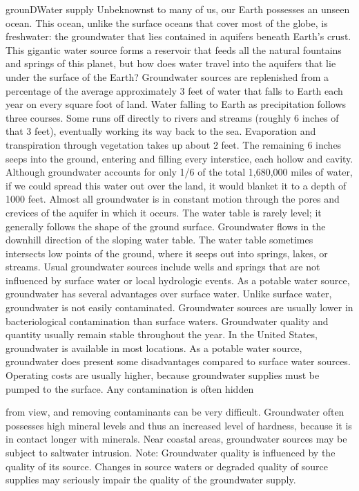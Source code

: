 \documentclass{article}
\begin{document}
grounDWater supply Unbeknownst to many of us, our Earth possesses an
unseen ocean. This ocean, unlike the surface oceans that cover most of
the globe, is freshwater: the groundwater that lies contained in
aquifers beneath Earth's crust. This gigantic water source forms a
reservoir that feeds all the natural fountains and springs of this
planet, but how does water travel into the aquifers that lie under the
surface of the Earth? Groundwater sources are replenished from a
percentage of the average approximately 3 feet of water that falls to
Earth each year on every square foot of land. Water falling to Earth as
precipitation follows three courses. Some runs off directly to rivers
and streams (roughly 6 inches of that 3 feet), eventually working its
way back to the sea. Evaporation and transpiration through vegetation
takes up about 2 feet. The remaining 6 inches seeps into the ground,
entering and filling every interstice, each hollow and cavity. Although
groundwater accounts for only 1/6 of the total 1,680,000 miles of water,
if we could spread this water out over the land, it would blanket it to
a depth of 1000 feet. Almost all groundwater is in constant motion
through the pores and crevices of the aquifer in which it occurs. The
water table is rarely level; it generally follows the shape of the
ground surface. Groundwater flows in the downhill direction of the
sloping water table. The water table sometimes intersects low points of
the ground, where it seeps out into springs, lakes, or streams. Usual
groundwater sources include wells and springs that are not influenced by
surface water or local hydrologic events. As a potable water source,
groundwater has several advantages over surface water. Unlike surface
water, groundwater is not easily contaminated. Groundwater sources are
usually lower in bacteriological contamination than surface waters.
Groundwater quality and quantity usually remain stable throughout the
year. In the United States, groundwater is available in most locations.
As a potable water source, groundwater does present some disadvantages
compared to surface water sources. Operating costs are usually higher,
because groundwater supplies must be pumped to the surface. Any
contamination is often hidden

from view, and removing contaminants can be very difficult. Groundwater
often possesses high mineral levels and thus an increased level of
hardness, because it is in contact longer with minerals. Near coastal
areas, groundwater sources may be subject to saltwater intrusion. Note:
Groundwater quality is influenced by the quality of its source. Changes
in source waters or degraded quality of source supplies may seriously
impair the quality of the groundwater supply.
\end{document}

